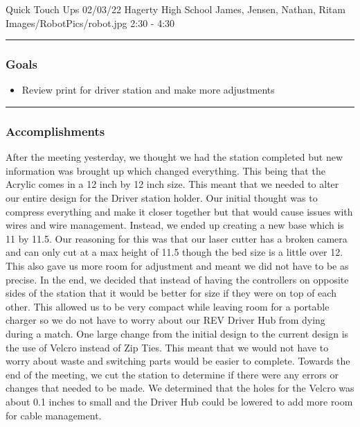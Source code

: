 \insertmeeting 
	{Quick Touch Ups} 
	{02/03/22} 
	{Hagerty High School}
	{James, Jensen, Nathan, Ritam}
	{Images/RobotPics/robot.jpg}
	{2:30 - 4:30}
	
\noindent\hfil\rule{\textwidth}{.4pt}\hfil
\subsubsection*{Goals}
\begin{itemize}
    \item Review print for driver station and make more adjustments

\end{itemize} 

\noindent\hfil\rule{\textwidth}{.4pt}\hfil

\subsubsection*{Accomplishments}
After the meeting yesterday, we thought we had the station completed but new information was brought up which changed everything. This being that the Acrylic comes in a 12 inch by 12 inch size. This meant that we needed to alter our entire design for the Driver station holder. Our initial thought was to compress everything and make it closer together but that would cause issues with wires and wire management. Instead, we ended up creating a new base which is 11 by 11.5. Our reasoning for this was that our laser cutter has a broken camera and can only cut at a max height of 11.5 though the bed size is a little over 12. This also gave us more room for adjustment and meant we did not have to be as precise. In the end, we decided that instead of having the controllers on opposite sides of the station that it would be better for size if they were on top of each other. This allowed us to be very compact while leaving room for a portable charger so we do not have to worry about our REV Driver Hub from dying during a match. One large change from the initial design to the current design is the use of Velcro instead of Zip Ties. This meant that we would not have to worry about waste and switching parts would be easier to complete. Towards the end of the meeting, we cut the station to determine if there were any errors or changes that needed to be made. We determined that the holes for the Velcro was about 0.1 inches to small and the Driver Hub could be lowered to add more room for cable management.

